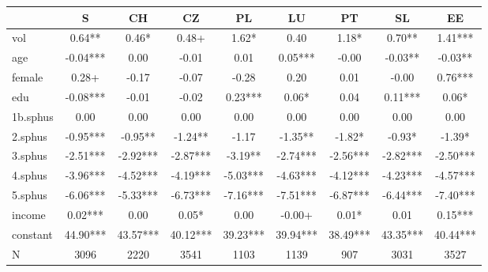 {
\def\sym#1{\ifmmode^{#1}\else\(^{#1}\)\fi}
\begin{tabular}{l*{8}{c}}
\hline\hline

                                &         S   &          CH   &          CZ   &           PL   &          LU  &          PT  &          SL  &           EE    \\
\hline
vol                 &        0.64** &        0.46*  &        0.48+  &        1.62*  &        0.40   &        1.18*  &        0.70** &        1.41***\\
age                 &       -0.04***&        0.00   &       -0.01   &        0.01   &        0.05***&       -0.00   &       -0.03** &       -0.03** \\
female              &        0.28+  &       -0.17   &       -0.07   &       -0.28   &        0.20   &        0.01   &       -0.00   &        0.76***\\
edu                 &       -0.08***&       -0.01   &       -0.02   &        0.23***&        0.06*  &        0.04   &        0.11***&        0.06*  \\
1b.sphus            &        0.00   &        0.00   &        0.00   &        0.00   &        0.00   &        0.00   &        0.00   &        0.00   \\
2.sphus             &       -0.95***&       -0.95** &       -1.24** &       -1.17   &       -1.35** &       -1.82*  &       -0.93*  &       -1.39*  \\
3.sphus             &       -2.51***&       -2.92***&       -2.87***&       -3.19** &       -2.74***&       -2.56***&       -2.82***&       -2.50***\\
4.sphus             &       -3.96***&       -4.52***&       -4.19***&       -5.03***&       -4.63***&       -4.12***&       -4.23***&       -4.57***\\
5.sphus             &       -6.06***&       -5.33***&       -6.73***&       -7.16***&       -7.51***&       -6.87***&       -6.44***&       -7.40***\\
income              &        0.02***&        0.00   &        0.05*  &        0.00   &       -0.00+  &        0.01*  &        0.01   &        0.15***\\
constant            &       44.90***&       43.57***&       40.12***&       39.23***&       39.94***&       38.49***&       43.35***&       40.44***\\
\hline
N                   &        3096   &        2220   &        3541   &        1103   &        1139   &         907   &        3031   &        3527   \\
\hline\hline
\end{tabular}
}
